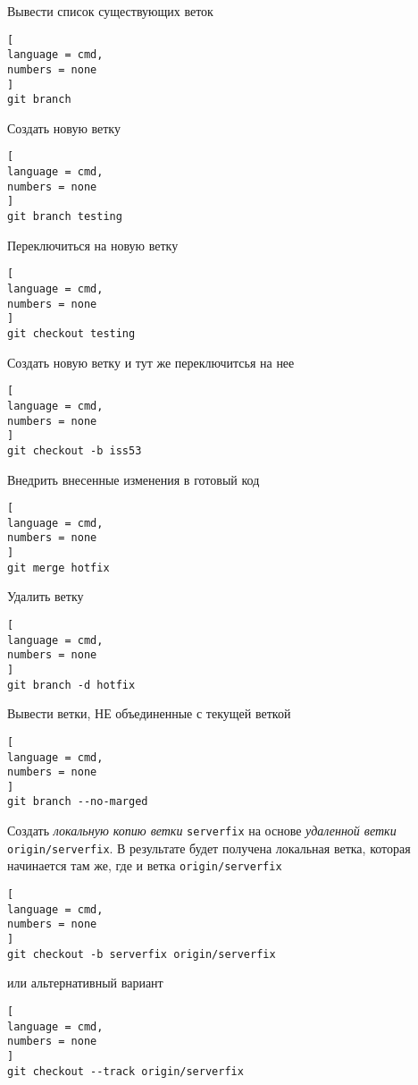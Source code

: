\documentclass[%
	11pt,
	a4paper,
	utf8,
		]{article}
\begin{document}
Вывести список существующих веток

\begin{lstlisting}[
language = cmd,
numbers = none
]
git branch
\end{lstlisting}


Создать новую ветку

\begin{lstlisting}[
language = cmd,
numbers = none
]
git branch testing
\end{lstlisting}

Переключиться на новую ветку

\begin{lstlisting}[
language = cmd,
numbers = none
]
git checkout testing
\end{lstlisting}

Создать новую ветку и тут же переключитсья на нее

\begin{lstlisting}[
language = cmd,
numbers = none
]
git checkout -b iss53
\end{lstlisting}


Внедрить внесенные изменения в готовый код

\begin{lstlisting}[
language = cmd,
numbers = none
]
git merge hotfix
\end{lstlisting}

Удалить ветку 

\begin{lstlisting}[
language = cmd,
numbers = none
]
git branch -d hotfix
\end{lstlisting}

Вывести ветки, НЕ объединенные с текущей веткой

\begin{lstlisting}[
language = cmd,
numbers = none
]
git branch --no-marged
\end{lstlisting}


Создать \emph{локальную копию ветки} \texttt{serverfix} на основе \emph{удаленной ветки} \texttt{origin/serverfix}. В результате будет получена локальная ветка, которая начинается там же, где и ветка \texttt{origin/serverfix}

\begin{lstlisting}[
language = cmd,
numbers = none
]
git checkout -b serverfix origin/serverfix
\end{lstlisting}

\noindent или альтернативный вариант

\begin{lstlisting}[
language = cmd,
numbers = none
]
git checkout --track origin/serverfix
\end{lstlisting}
\end{document}
